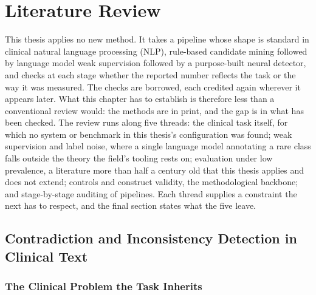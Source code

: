 %
%

\chapter{Literature Review}
\label{ch:lit}

This thesis applies no new method. It takes a pipeline whose shape is standard in clinical natural
language processing (NLP), rule-based candidate mining followed by language model weak supervision
followed by a purpose-built neural detector, and checks at each stage whether the reported number
reflects the task or the way it was measured. The checks are borrowed, each credited again wherever
it appears later. What this chapter has to establish is therefore less than a conventional review would: the methods are in print, and the gap is in what has been checked. The review runs along five threads: the clinical task itself, for which no system or benchmark in this thesis's
configuration was found; weak supervision and label noise, where a single language model annotating a
rare class falls outside the theory the field's tooling rests on; evaluation under low prevalence, a
literature more than half a century old that this thesis applies and does not extend; controls and
construct validity, the methodological backbone; and stage-by-stage
auditing of pipelines. Each thread supplies a constraint the next has to respect, and the final section states what the
five leave.

\section{Contradiction and Inconsistency Detection in Clinical Text}
\label{sec:lit-contradiction}

\subsection{The Clinical Problem the Task Inherits}

